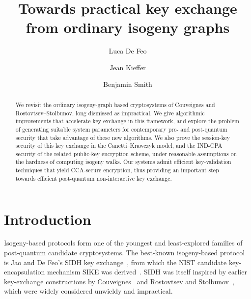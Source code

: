\documentclass{llncs}
\begin{document}
\title{Towards practical key exchange\\ from ordinary isogeny graphs}
\author{
  Luca De Feo \and
  Jean Kieffer \and
  Benjamin Smith
}

\maketitle

\begin{abstract}
    We revisit the ordinary isogeny-graph based cryptosystems
    of Couveignes and Rostovtsev--Stolbunov,
    long dismissed as impractical.
    We give algorithmic improvements that accelerate key exchange
    in this framework,
    and explore the problem of generating suitable system parameters
    for contemporary pre- and post-quantum security that take
		advantage of these new algorithms.
    We also prove the session-key security of this key exchange
    in the Canetti--Krawczyk model,
    and the IND-CPA security of the related public-key encryption scheme,
    under reasonable assumptions on the hardness of computing isogeny walks.
    Our systems admit efficient key-validation techniques that
    yield CCA-secure encryption,
    thus providing an important step towards
    efficient post-quantum non-interactive key exchange.

\end{abstract}

\section{Introduction}
\label{sec:introduction}

Isogeny-based protocols
form one of the youngest and least-explored
families of post-quantum candidate cryptosystems.
The best-known isogeny-based protocol
is Jao and De Feo's SIDH key exchange~\cite{jao+defeo2011},
from which the NIST candidate key-encapsulation mechanism
SIKE was derived~\cite{SIKE,NIST2016}.
SIDH was itself inspired by earlier
key-exchange constructions
by Couveignes~\cite{cryptoeprint:2006:291}
and Rostovtsev and
Stolbunov~\cite{rostovtsev+stolbunov06,stolbunov-red,Stol},
which were widely considered unwieldy and impractical.
\end{document}
